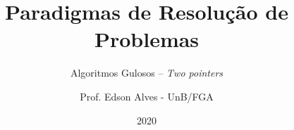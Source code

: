 \title{Paradigmas de Resolução de Problemas}
\subtitle{Algoritmos Gulosos -- {\it Two pointers}}
\author{Prof. Edson Alves - UnB/FGA}
\date{2020}
